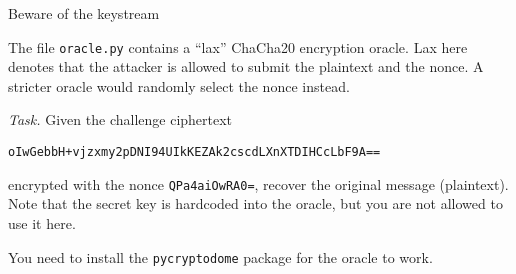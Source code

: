 \documentclass{practice}
\begin{document}
\begin{task}{Beware of the keystream}


  The file \texttt{oracle.py} contains a \enquote{lax} ChaCha20 encryption oracle.
  Lax here denotes that the attacker is allowed to submit the plaintext and the nonce.
  A stricter oracle would randomly select the nonce instead.

  \textit{Task.}
  Given the challenge ciphertext
  \begin{Verbatim}
oIwGebbH+vjzxmy2pDNI94UIkKEZAk2cscdLXnXTDIHCcLbF9A==
  \end{Verbatim}
  encrypted with the nonce \texttt{QPa4aiOwRA0=}, recover the original message (plaintext).
  Note that the secret key is hardcoded into the oracle, but you are not allowed to use it here.

  You need to install the \texttt{pycryptodome}\footnotemark{} package for the oracle to work.
\end{task}
\end{document}
